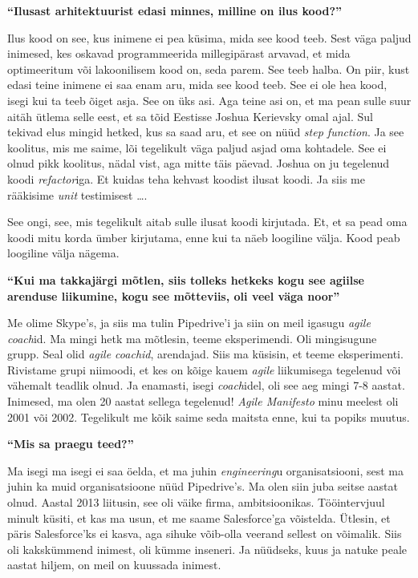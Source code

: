 \textbf{\enquote{Ilusast arhitektuurist edasi minnes, milline on ilus kood?}}

Ilus kood on see, kus inimene ei pea küsima, mida see kood teeb. Sest väga paljud inimesed, kes oskavad programmeerida millegipärast arvavad, et mida optimeeritum või lakoonilisem kood on, seda parem. See teeb halba. On piir, kust edasi teine inimene ei saa enam aru, mida see kood teeb. See ei ole hea kood, isegi kui ta teeb õiget asja. See on üks asi. Aga teine asi on, et ma pean sulle suur aitäh ütlema selle eest, et sa tõid Eestisse Joshua Kerievsky omal ajal. Sul tekivad elus mingid hetked, kus sa saad aru, et see on nüüd \emph{step function}. Ja see koolitus, mis me saime, lõi tegelikult väga paljud asjad oma kohtadele. See ei olnud pikk koolitus, nädal vist, aga mitte täis päevad. Joshua on ju tegelenud koodi \emph{refactor}iga. Et kuidas teha kehvast koodist ilusat koodi. Ja siis me rääkisime \emph{unit} testimisest \ldots.

See ongi, see, mis tegelikult aitab sulle ilusat koodi kirjutada. Et, et sa pead oma koodi mitu korda ümber kirjutama, enne kui ta näeb loogiline välja. Kood peab loogiline välja nägema.

\textbf{\enquote{Kui ma takkajärgi mõtlen, siis tolleks hetkeks kogu see agiilse arenduse liikumine, kogu see mõtteviis, oli veel väga noor}}

Me olime Skype's, ja siis ma tulin Pipedrive'i ja siin on meil igasugu \emph{agile coach}id. Ma mingi hetk ma mõtlesin, teeme eksperimendi. Oli mingisugune grupp. Seal olid \emph{agile coachid}, arendajad. Siis ma küsisin, et teeme eksperimenti. Rivistame grupi niimoodi, et kes on kõige kauem \emph{agile} liikumisega tegelenud  või vähemalt teadlik olnud. Ja enamasti, isegi \emph{coach}idel, oli see aeg mingi 7-8 aastat. Inimesed, ma olen 20 aastat sellega tegelenud! \emph{Agile Manifesto} minu meelest oli 2001 või 2002. Tegelikult me kõik saime seda maitsta enne, kui ta popiks muutus.

\textbf{\enquote{Mis sa praegu teed?}}

Ma isegi ma isegi ei saa öelda, et ma juhin \emph{engineering}u organisatsiooni, sest ma juhin ka muid organisatsioone nüüd Pipedrive's. Ma olen siin juba seitse aastat olnud. Aastal 2013 liitusin, see oli väike firma, ambitsioonikas. Tööintervjuul minult küsiti, et kas ma usun, et me saame Salesforce'ga võistelda. Ütlesin, et päris Salesforce'ks ei kasva, aga sihuke võib-olla veerand sellest on võimalik. Siis oli kakskümmend inimest, oli kümme inseneri. Ja nüüdseks, kuus ja natuke peale aastat hiljem, on meil on kuussada inimest.

